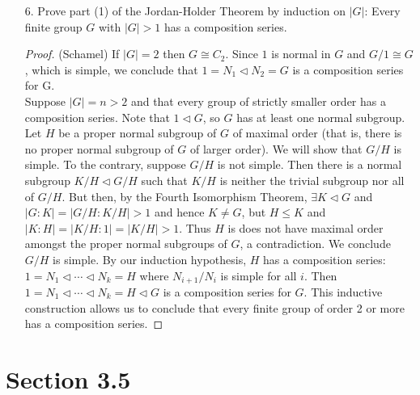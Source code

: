 \documentclass[10pt]{article}
\newcommand{\normsub}{\triangleleft}
\begin{document}
\begin{itemize}
\begin{proof}
Therefore $(G_{i+1}H)/(G_iH)$ is Abelian and so is
$\left((G_{i+1}H)/H\right)/\left((G_iH)/H\right)$. Thus, $G/H$ is
solvable.

Hence we find that subgroups and quotient groups of solvable groups
are solvable.
\end{proof}

\item[6.] Prove part (1) of the Jordan-Holder Theorem by induction on $|G|$:  Every finite group $G$ with $|G| > 1$ has a composition series.

\begin{proof}(Schamel)
If $|G| = 2$ then $G \cong C_2$.  Since $1$ is normal in $G$ and $G/1 \cong G$, which is simple, we conclude that $1 = N_1 \normsub N_2 = G$ is a composition series for G. \\

Suppose $|G| =n > 2$ and that every group of strictly smaller order has a composition series.  Note that $1 \normsub G$, so $G$ has at least one normal subgroup.  Let $H$ be a proper normal subgroup of $G$ of maximal order (that is, there is no proper normal subgroup of $G$ of larger order).  We will show that $G/H$ is simple.  To the contrary, suppose $G/H$ is not simple.  Then there is a normal subgroup $K/H \normsub G/H$ such that $K/H$ is neither the trivial subgroup nor all of $G/H$.  But then, by the Fourth Isomorphism Theorem, $\exists K \normsub G$ and $|G : K| = |G/H: K/H| > 1$ and hence $K \neq G$, but $H \leq K$ and $|K : H| = |K/H : 1| = |K/H| > 1$.  Thus $H$ is does not have maximal order amongst the proper normal subgroups of $G$, a contradiction.  We conclude $G/H$ is simple.  By our induction hypothesis, $H$ has a composition series: $1 = N_1 \normsub \cdots \normsub N_k = H$ where $N_{i+1}/N_i$ is simple for all $i$.  Then $1 = N_1 \normsub \cdots \normsub N_k = H \normsub G$ is a composition series for $G$.  This inductive construction allows us to conclude that every finite group of order 2 or more has a composition series.
\end{proof}

\end{itemize}

\section*{Section 3.5}
\end{document}
